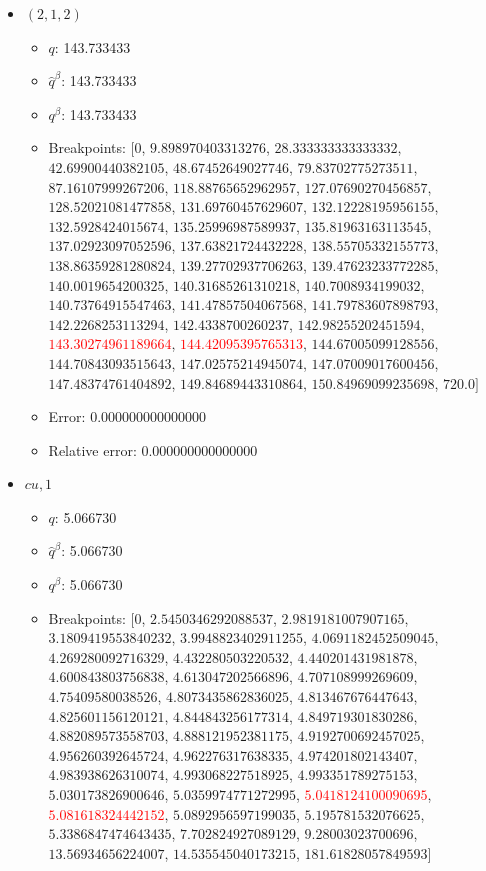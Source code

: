 \documentclass{article}%
\begin{document}
\begin{itemize}
\begin{itemize}
		\item Error: 0.000000000000000%
		\item Relative error: 0.000000000000000%
	\end{itemize}%
	\item $(2, 1, 2)$%
	\begin{itemize}%
		\item $q$: 143.733433%
		\item $\hat{q}^\beta$: 143.733433%
		\item $q^\beta$: 143.733433%
		\item Breakpoints: $[$$0$, $9.898970403313276$, $28.333333333333332$, $42.69900440382105$, $48.67452649027746$, $79.83702775273511$, $87.16107999267206$, $118.88765652962957$, $127.07690270456857$, $128.52021081477858$, $131.69760457629607$, $132.12228195956155$, $132.5928424015674$, $135.25996987589937$, $135.81963163113545$, $137.02923097052596$, $137.63821724432228$, $138.55705332155773$, $138.86359281280824$, $139.27702937706263$, $139.47623233772285$, $140.0019654200325$, $140.31685261310218$, $140.7008934199032$, $140.73764915547463$, $141.47857504067568$, $141.79783607898793$, $142.2268253113294$, $142.4338700260237$, $142.98255202451594$, \textcolor{red}{$143.30274961189664$}, \textcolor{red}{$144.42095395765313$}, $144.67005099128556$, $144.70843093515643$, $147.02575214945074$, $147.07009017600456$, $147.48374761404892$, $149.84689443310864$, $150.84969099235698$, $720.0$$]$%
		\item Error: 0.000000000000000%
		\item Relative error: 0.000000000000000%
	\end{itemize}%
	\item $\textit{cu},1$%
	\begin{itemize}%
		\item $q$: 5.066730%
		\item $\hat{q}^\beta$: 5.066730%
		\item $q^\beta$: 5.066730%
		\item Breakpoints: $[$$0$, $2.5450346292088537$, $2.9819181007907165$, $3.1809419553840232$, $3.9948823402911255$, $4.0691182452509045$, $4.269280092716329$, $4.432280503220532$, $4.440201431981878$, $4.600843803756838$, $4.613047202566896$, $4.707108999269609$, $4.75409580038526$, $4.8073435862836025$, $4.813467676447643$, $4.825601156120121$, $4.844843256177314$, $4.849719301830286$, $4.882089573558703$, $4.888121952381175$, $4.9192700692457025$, $4.956260392645724$, $4.962276317638335$, $4.974201802143407$, $4.983938626310074$, $4.993068227518925$, $4.993351789275153$, $5.030173826900646$, $5.0359974771272995$, \textcolor{red}{$5.0418124100090695$}, \textcolor{red}{$5.081618324442152$}, $5.0892956597199035$, $5.195781532076625$, $5.3386847474643435$, $7.702824927089129$, $9.28003023700696$, $13.56934656224007$, $14.535545040173215$, $181.61828057849593$$]$%

\end{itemize}
\end{itemize}
\end{document}
